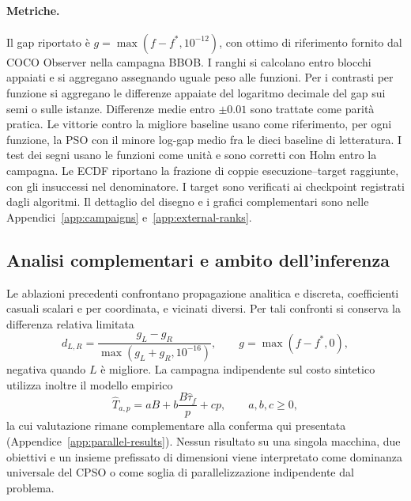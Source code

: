 \paragraph{Metriche.}
Il gap riportato è $g=\max(f-f^*,10^{-12})$, con ottimo di riferimento fornito dal COCO Observer nella campagna BBOB. I ranghi si calcolano entro blocchi appaiati e si aggregano assegnando uguale peso alle funzioni. Per i contrasti per funzione si aggregano le differenze appaiate del logaritmo decimale del gap sui semi o sulle istanze. Differenze medie entro $\pm0.01$ sono trattate come parità pratica. Le vittorie contro la migliore baseline usano come riferimento, per ogni funzione, la PSO con il minore log-gap medio fra le dieci baseline di letteratura. I test dei segni usano le funzioni come unità e sono corretti con Holm entro la campagna. Le ECDF riportano la frazione di coppie esecuzione--target raggiunte, con gli insuccessi nel denominatore. I target sono verificati ai checkpoint registrati dagli algoritmi. Il dettaglio del disegno e i grafici complementari sono nelle Appendici~\ref{app:campaigns} e~\ref{app:external-ranks}.

\subsection{Analisi complementari e ambito dell'inferenza}
Le ablazioni precedenti confrontano propagazione analitica e discreta, coefficienti casuali scalari e per coordinata, e vicinati diversi. Per tali confronti si conserva la differenza relativa limitata
\begin{equation}
 d_{L,R}=\frac{g_L-g_R}{\max(g_L+g_R,10^{-16})},\qquad
 g=\max(f-f^*,0),\label{eq:relative-effect}
\end{equation}
negativa quando $L$ è migliore. La campagna indipendente sul costo sintetico utilizza inoltre il modello empirico
\begin{equation}
 \widehat T_{a,p}=aB+b\frac{B\widehat\tau_f}{p}+cp,
 \qquad a,b,c\geq0,\label{eq:overhead-model}
\end{equation}
la cui valutazione rimane complementare alla conferma qui presentata (Appendice~\ref{app:parallel-results}). Nessun risultato su una singola macchina, due obiettivi e un insieme prefissato di dimensioni viene interpretato come dominanza universale del CPSO o come soglia di parallelizzazione indipendente dal problema.
